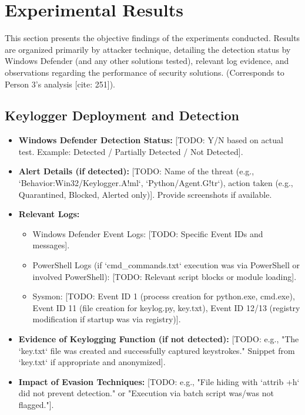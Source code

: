 \documentclass[11pt]{article}
\begin{document}
	\section{Experimental Results}
	This section presents the objective findings of the experiments conducted. Results are organized primarily by attacker technique, detailing the detection status by Windows Defender (and any other solutions tested), relevant log evidence, and observations regarding the performance of security solutions. (Corresponds to Person 3's analysis [cite: 251]).
	
	\subsection{Keylogger Deployment and Detection}
	\begin{itemize}
		\item \textbf{Windows Defender Detection Status:} [TODO: Y/N based on actual test. Example: Detected / Partially Detected / Not Detected].
		\item \textbf{Alert Details (if detected):} [TODO: Name of the threat (e.g., `Behavior:Win32/Keylogger.A!ml`, `Python/Agent.G!tr`), action taken (e.g., Quarantined, Blocked, Alerted only)]. Provide screenshots if available.
		\item \textbf{Relevant Logs:}
		\begin{itemize}
			\item Windows Defender Event Logs: [TODO: Specific Event IDs and messages].
			\item PowerShell Logs (if `cmd\_commands.txt` execution was via PowerShell or involved PowerShell): [TODO: Relevant script blocks or module loading].
			\item Sysmon: [TODO: Event ID 1 (process creation for python.exe, cmd.exe), Event ID 11 (file creation for keylog.py, key.txt), Event ID 12/13 (registry modification if startup was via registry)].
		\end{itemize}
		\item \textbf{Evidence of Keylogging Function (if not detected):} [TODO: e.g., "The `key.txt` file was created and successfully captured keystrokes." Snippet from `key.txt` if appropriate and anonymized].
		\item \textbf{Impact of Evasion Techniques:} [TODO: e.g., "File hiding with `attrib +h` did not prevent detection." or "Execution via batch script was/was not flagged."].
	\end{itemize}
	
\end{document}
